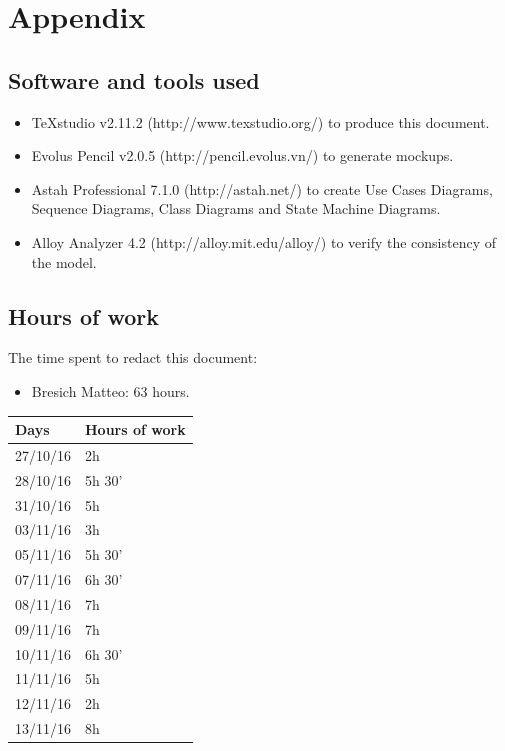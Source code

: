 \documentclass{article}
\begin{document}
		
	\pagebreak
	
	
	
	
	\section{Appendix}
	
	\subsection{Software and tools used} 
	
	\begin{itemize}
		\item TeXstudio v2.11.2 (http://www.texstudio.org/) to produce this document.
		\item Evolus Pencil v2.0.5 (http://pencil.evolus.vn/) to generate mockups.
		\item Astah Professional 7.1.0 (http://astah.net/) to create Use Cases Diagrams, Sequence Diagrams, Class Diagrams and State Machine Diagrams. 
		\item Alloy Analyzer 4.2 (http://alloy.mit.edu/alloy/) to verify the consistency of the model.
	\end{itemize}
	
	\subsection{Hours of work} The time spent to redact this document:
	\begin{itemize}
		\item Bresich Matteo: 63 hours.
	\end{itemize}
	
	\begin{center}
		\begin{tabular}{ | l | l |}
			\hline
			Days & Hours of work\\ \hline
			27/10/16 & 2h\\\hline
			28/10/16 & 5h 30' \\\hline
			31/10/16 & 5h \\\hline
			03/11/16 & 3h \\\hline
			05/11/16 & 5h 30' \\\hline
			07/11/16 & 6h 30' \\\hline
			08/11/16 & 7h \\\hline
			09/11/16 & 7h \\\hline
			10/11/16 & 6h 30' \\\hline
			11/11/16 & 5h\\\hline
			12/11/16 & 2h\\\hline
			13/11/16 & 8h\\\hline

		\end{tabular}
	\end{center}
	
\end{document}
